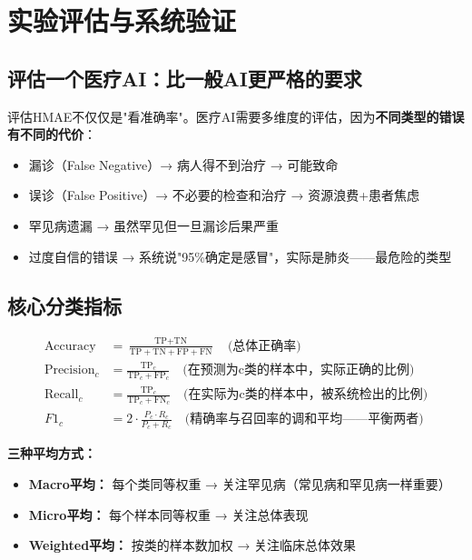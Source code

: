 \documentclass[11pt,a4paper]{ctexart}
\begin{document}
\newpage

\section{实验评估与系统验证}

\subsection{评估一个医疗AI：比一般AI更严格的要求}

评估HMAE不仅仅是"看准确率"。医疗AI需要多维度的评估，因为\textbf{不同类型的错误有不同的代价}：
\begin{itemize}[nosep]
\item 漏诊（False Negative）→ 病人得不到治疗 → 可能致命
\item 误诊（False Positive）→ 不必要的检查和治疗 → 资源浪费+患者焦虑
\item 罕见病遗漏 → 虽然罕见但一旦漏诊后果严重
\item 过度自信的错误 → 系统说"95\%确定是感冒"，实际是肺炎——最危险的类型
\end{itemize}

\subsection{核心分类指标}

\begin{align}
\text{Accuracy} &= \frac{\text{TP} + \text{TN}}{\text{TP} + \text{TN} + \text{FP} + \text{FN}} \quad \text{(总体正确率)} \\
\text{Precision}_c &= \frac{\text{TP}_c}{\text{TP}_c + \text{FP}_c} \quad \text{(在预测为c类的样本中，实际正确的比例)} \\
\text{Recall}_c &= \frac{\text{TP}_c}{\text{TP}_c + \text{FN}_c} \quad \text{(在实际为c类的样本中，被系统检出的比例)} \\
F1_c &= 2 \cdot \frac{P_c \cdot R_c}{P_c + R_c} \quad \text{(精确率与召回率的调和平均——平衡两者)}
\end{align}

\textbf{三种平均方式：}
\begin{itemize}[nosep]
\item \textbf{Macro平均：} 每个类同等权重 → 关注罕见病（常见病和罕见病一样重要）
\item \textbf{Micro平均：} 每个样本同等权重 → 关注总体表现
\item \textbf{Weighted平均：} 按类的样本数加权 → 关注临床总体效果
\end{itemize}
\end{document}
